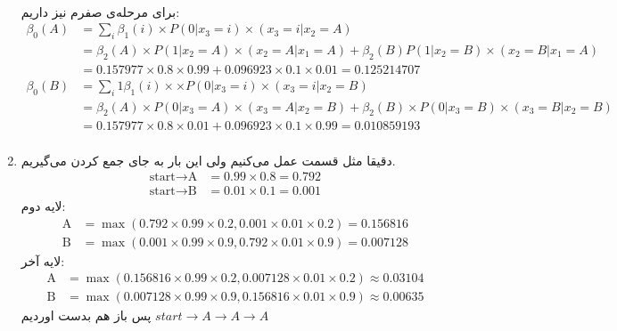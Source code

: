 \begin{enumerate}
\begin{align*}
    \end{align*}
    برای مرحله‌ی صفرم نیز داریم:
    \begin{align*}
        \beta_0(A) &= \sum_i \beta_1(i) \times P(0 | x_3 = i) \times (x_3 = i | x_2 = A)\\
        &= \beta_2(A) \times P(1 | x_2 = A) \times (x_2 = A | x_1 = A) + \beta_2(B) P(1 | x_2 = B) \times (x_2 = B | x_1 = A)\\
        &= 0.157977 \times 0.8 \times 0.99 + 0.096923 \times 0.1 \times 0.01 = 0.125214707\\
        \beta_0(B) &= \sum_i 1 \beta_1(i) \times \times P(0 | x_3 = i) \times (x_3 = i | x_2 = B)\\
        &= \beta_2(A) \times P(0 | x_3 = A) \times (x_3 = A | x_2 = B) + \beta_2(B) \times P(0 | x_3 = B) \times (x_3 = B | x_2 = B)\\
        &= 0.157977 \times 0.8 \times 0.01 + 0.096923 \times 0.1 \times 0.99 = 0.010859193\\
    \end{align*}
    \item دقیقا مثل قسمت  عمل می‌کنیم ولی این بار به جای جمع کردن  می‌گیریم.
    \begin{align*}
        \text{start} \rightarrow \text{A} &= 0.99 \times 0.8 = 0.792\\
        \text{start} \rightarrow \text{B} &= 0.01 \times 0.1 = 0.001
    \end{align*}
    لایه دوم:
    \begin{align*}
        \text{A} &= \max(0.792 \times 0.99 \times 0.2, 0.001 \times 0.01 \times 0.2) = 0.156816\\
        \text{B} &= \max(0.001 \times 0.99 \times 0.9, 0.792 \times 0.01 \times 0.9) = 0.007128
    \end{align*}
    لایه آخر:
    \begin{align*}
        \text{A} &= \max(0.156816 \times 0.99 \times 0.2, 0.007128 \times 0.01 \times 0.2) \approx 0.03104\\
        \text{B} &= \max(0.007128 \times 0.99 \times 0.9, 0.156816 \times 0.01 \times 0.9) \approx 0.00635
    \end{align*}
    پس باز هم بدست اوردیم
    $start \rightarrow A \rightarrow A \rightarrow A$
\end{enumerate}